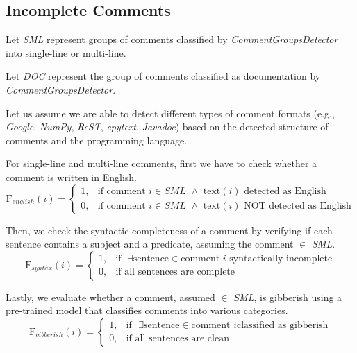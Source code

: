 \subsection{Incomplete Comments}
Let \textit{SML} represent groups of comments classified by \textit{CommentGroupsDetector} into single-line or multi-line.

\noindent Let \textit{DOC} represent the group of comments classified as documentation by \textit{CommentGroupsDetector}.

\noindent Let us assume we are able to detect different types of comment formats (e.g., \textit{Google}, \textit{NumPy}, \textit{ReST}, \textit{epytext}, \textit{Javadoc}) based on the detected structure of comments and the programming language.

\noindent For single-line and multi-line comments, first we have to check whether a comment is written in English.
\begin{equation*}
	\mathrm{F}_{english}(i) = \begin{cases}
		1, & \text{if comment } i \in \textit{SML } \wedge \text{ text}(i) \text{ detected as English} \\
		0, & \text{if comment } i \in \textit{SML } \wedge \text{ text}(i) \text{ NOT detected as English}
	\end{cases}
\end{equation*}

\noindent Then, we check the syntactic completeness of a comment by verifying if each sentence contains a subject and a predicate, assuming the comment $\in$ \textit{SML}.
\begin{equation*}
	\mathrm{F}_{syntax}(i) = \begin{cases}
		1, & \text{if  } \exists \text{sentence} \in \text{comment } i \text{ syntactically incomplete} \\
		0, & \text{if all sentences are complete}
	\end{cases}
\end{equation*}

\noindent Lastly, we evaluate whether a comment, assumed $\in$ \textit{SML}, is gibberish using a pre-trained model \cite{gibberishDetector} that classifies comments into various categories.
\begin{equation*}
	\mathrm{F}_{gibberish}(i) = \begin{cases}
		1, & \text{if  } \exists \text{sentence} \in \text{comment } i \text{classified as gibberish} \\
		0, & \text{if all sentences are clean}
	\end{cases}
\end{equation*}

